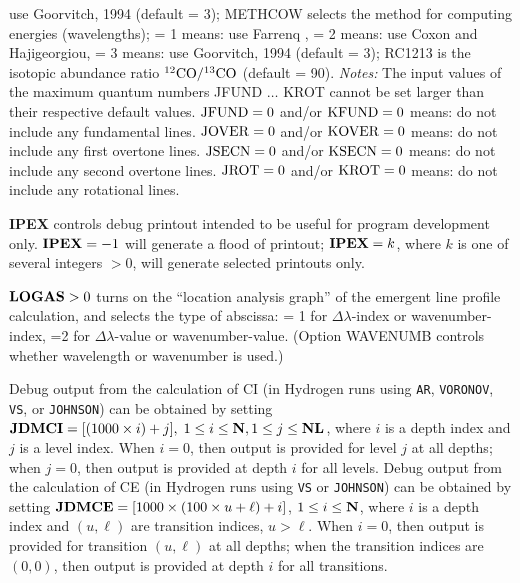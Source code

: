 use Goorvitch, 1994 (default = 3); \np
METHCOW selects the method for computing energies (wavelengths); \break
= 1 means: use Farrenq \ea, = 2 means: use Coxon and Hajigeorgiou,
\break = 3 means: use Goorvitch, 1994 (default = 3); \np
RC1213 is the isotopic abundance ratio ${^{12}{\rm CO}}/{^{13}{\rm CO}}$
(default = 90). \np
{\it Notes:} \np
The input values of the maximum quantum numbers JFUND $\ldots$ KROT
cannot be set larger than their respective default values. \np
${\rm JFUND} = 0$ and/or ${\rm KFUND} = 0$ means: do not include any
fundamental lines. \np
${\rm JOVER} = 0$ and/or ${\rm KOVER} = 0$ means: do not include any
first overtone lines. \np
${\rm JSECN} = 0$ and/or ${\rm KSECN} = 0$ means: do not include any
second overtone lines. \np
${\rm JROT} = 0$ and/or ${\rm KROT} = 0$ means: do not include any
rotational lines. \np
\ej
\centerline{}
\space \noindent
{\bf IPEX} controls debug printout intended to be useful for program
development only. ${\bf IPEX} = -1$ will generate a flood of printout;
${\bf IPEX} = k$, where $k$ is one of several integers $> 0$, will generate
selected printouts only.
\blankline
\blankline
\centerline{}
\space \noindent
${\bf LOGAS} > 0$ turns on the ``location analysis graph'' of the emergent
line profile calculation, and selects the type of abscissa: = 1 for
$\Delta\lambda$-index or wavenumber-index, =2 for $\Delta\lambda$-value or
wavenumber-value. (Option WAVENUMB controls whether wavelength or wavenumber 
is used.)
\blankline
\blankline
\centerline{}
\space \noindent
Debug output from the calculation of CI (in Hydrogen runs using {\tt AR}, 
{\tt VORONOV}, {\tt VS}, or {\tt JOHNSON})
can be obtained by setting ${\bf JDMCI} = [(1000 \times i) + j], \;
1 \leq i \leq {\bf N}, \break 1 \leq j \leq {\bf NL}$, where $i$ is a depth index and
$j$ is a level index. When $i = 0$, then output is provided for level $j$ at all
depths; when $j = 0$, then output is provided at depth $i$ for all levels. \np
Debug output from the calculation of CE (in Hydrogen runs using {\tt VS}
or {\tt JOHNSON}) can be obtained by setting ${\bf JDMCE} = [1000 \times 
(100 \times u + \ell) + i]$, \break $1 \leq i \leq {\bf N}$, where $i$ is a depth
index and $(u,\ell)$ are transition indices, $u > \ell$. When $i = 0$, then output
is provided for transition $(u,\ell)$ at all depths; when the transition indices
are $(0,0)$, then output is provided at depth $i$ for all transitions.
